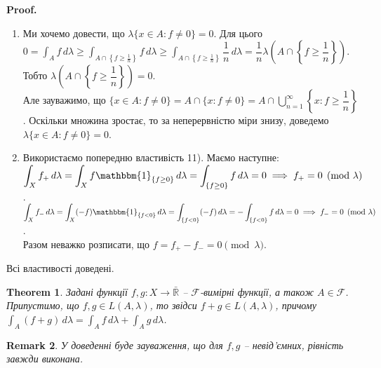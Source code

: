 \documentclass[a4paper, 10pt]{article}
\makeatletter
\theoremstyle{theoremdd}
\newtheorem{theorem}{Theorem}[subsection]
\newtheorem{remark}[theorem]{Remark}
\renewenvironment{proof}[1][Proof.\\]{\par
\pushQED{\hfill \qed}%
\normalfont \topsep6\p@\@plus6\p@\relax
\trivlist
\item\relax
{\bfseries
#1\@addpunct{.}}\hspace\labelsep\ignorespaces
}{%
\popQED\endtrivlist\@endpefalse
}
\makeatother
\begin{document}
\begin{proof}
\begin{enumerate}[wide=0pt,label={\arabic*)}]
\item Ми хочемо довести, що $\lambda\{x \in A: f \neq 0\} = 0$. Для цього\\
$0 = \displaystyle\int_A f\,d\lambda \geq \int_{A \cap \left\{ f \geq \frac{1}{n} \right\}} f\,d\lambda \geq \int_{A \cap \left\{ f \geq \frac{1}{n} \right\}} \dfrac{1}{n}\,d\lambda = \dfrac{1}{n} \lambda\left(A \cap \left\{ f \geq \dfrac{1}{n} \right\}\right)$.\\
Тобто $\lambda\left(A \cap \left\{ f \geq \dfrac{1}{n} \right\}\right) = 0$. \\
Але зауважимо, що $\displaystyle\{x \in A: f \neq 0\} = A \cap \{x: f \neq 0 \} = A \cap \bigcup_{n=1}^\infty \left\{ x: f \geq \dfrac{1}{n} \right\}$. Оскільки множина зростає, то за неперервністю міри знизу, доведемо $\lambda\{x \in A: f \neq 0\} = 0$.

\item Використаємо попередню властивість 11). Маємо наступне:\\
$\displaystyle\int_X f_+\,d\lambda = \int_X f \mathbbm{1}_{\{f \geq 0\}}\,d\lambda = \int_{\{f \geq 0\}} f\,d\lambda = 0 \implies f_+ = 0 \pmod \lambda$.\\
$\displaystyle\int_X f_-\,d\lambda = \int_X (-f)\mathbbm{1}_{\{f < 0 \}}\,d\lambda = \int_{\{f<0\}}(-f)\,d\lambda = -\int_{\{f < 0\}}f\,d\lambda = 0 \implies f_- = 0 \pmod \lambda$.\\
Разом неважко розписати, що $f = f_+ - f_- = 0 \pmod \lambda$.
\end{enumerate}
Всі властивості доведені.
\end{proof}

\begin{theorem}
Задані функції $f,g \colon X \to \bar{\mathbb{R}}$ -- $\mathcal{F}$-вимірні функції, а також $A \in \mathcal{F}$. Припустимо, що $f,g \in L(A,\lambda)$, то звідси $f+g \in L(A,\lambda)$, причому\\
$\displaystyle\int_A (f+g)\,d\lambda = \int_A f\,d\lambda + \int_A g\,d\lambda$.
\end{theorem}

\begin{remark}
У доведенні буде зауваження, що для $f,g$ -- невід'ємних, рівність завжди виконана.
\end{remark}
\end{document}
